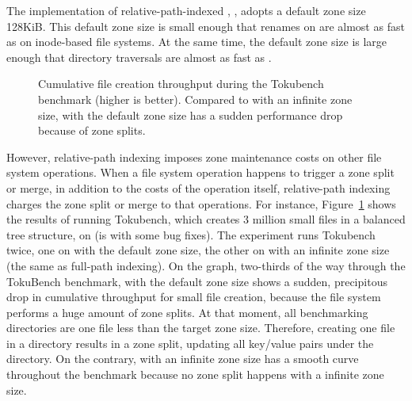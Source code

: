 The implementation of relative-path-indexed \betrfs, \betrfsTwo, adopts a
default zone size 128KiB.
This default zone size is small enough that renames on \betrfsTwo are almost
as fast as on inode-based file systems.
At the same time, the default zone size is large enough that directory
traversals are almost as fast as \betrfsOne.

\begin{figure}[t]
    \centering
    \caption[Zone maintainance cost in TokuBench benchmark]{
        Cumulative file creation throughput during the Tokubench benchmark (higher is better).
        Compared to \betrfsThree with an infinite zone size,
        \betrfsThree with the default zone size has a sudden
        performance drop because of zone splits.}
    \label{fig:tokuzone}
\end{figure}

However, relative-path indexing imposes zone maintenance costs on other file
system operations.
When a file system operation happens to trigger a zone split or merge,
in addition to the costs of the operation itself,
relative-path indexing charges the zone split or merge to that operations.
For instance, Figure~\ref{fig:tokuzone} shows the results of running Tokubench,
which creates 3 million small files in a balanced tree structure,
on \betrfsThree
(\betrfsThree is \betrfsTwo with some bug fixes).
The experiment runs Tokubench twice,
one on \betrfsThree with the default zone size,
the other on \betrfsThree with an infinite zone size
(the same as full-path indexing).
On the graph, two-thirds of the way through the TokuBench benchmark,
\betrfsThree with the default zone size shows a sudden,
precipitous drop in cumulative throughput for small file creation,
because the file system performs a huge amount of zone splits.
At that moment, all benchmarking directories are one file less than the target
zone size.
Therefore, creating one file in a directory results in a zone split,
updating all key/value pairs under the directory.
On the contrary, \betrfsThree with an infinite zone size
has a smooth curve throughout the benchmark
because no zone split happens with a infinite zone size.

